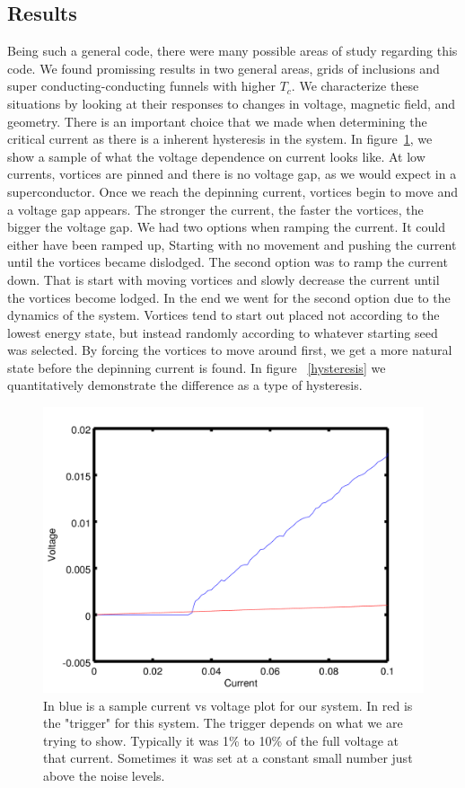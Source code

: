 \subsection{Results}
Being such a general code, there were many possible areas of study regarding this code. We found promissing results in two general areas, grids of inclusions and super conducting-conducting funnels with higher $T_c$. We characterize these situations by looking at their responses to changes in voltage, magnetic field, and geometry. There is an important choice that we made when determining the critical current as there is a inherent hysteresis in the system. In figure~\ref{trigger}, we show a sample of what the voltage dependence on current looks like. At low currents, vortices are pinned and there is no voltage gap, as we would expect in a superconductor. Once we reach the depinning current, vortices begin to move and a voltage gap appears. The stronger the current, the faster the vortices, the bigger the voltage gap. We had two options when ramping the current. It could either have been ramped up, Starting with no movement and pushing the current until the vortices became dislodged. The second option was to ramp the current down. That is start with moving vortices and slowly decrease the current until the vortices become lodged. In the end we went for the second option due to the dynamics of the system. Vortices tend to start out placed not according to the lowest energy state, but instead randomly according to whatever starting seed was selected. By forcing the vortices to move around first, we get a more natural state before the depinning current is found. In figure ~\ref{hysteresis} we quantitatively demonstrate the difference as a type of hysteresis.

\begin{figure}[htbp]
\begin{center}
\includegraphics[scale=.50]{trigger.png}
\caption{ In blue is a sample current vs voltage plot for our system. In red is the "trigger" for this system. The trigger depends on what we are trying to show. Typically it was 1\% to 10\% of the full voltage at that current. Sometimes it was set at a constant small number just above the noise levels.}
\label{trigger}
\end{center}
\end{figure}

